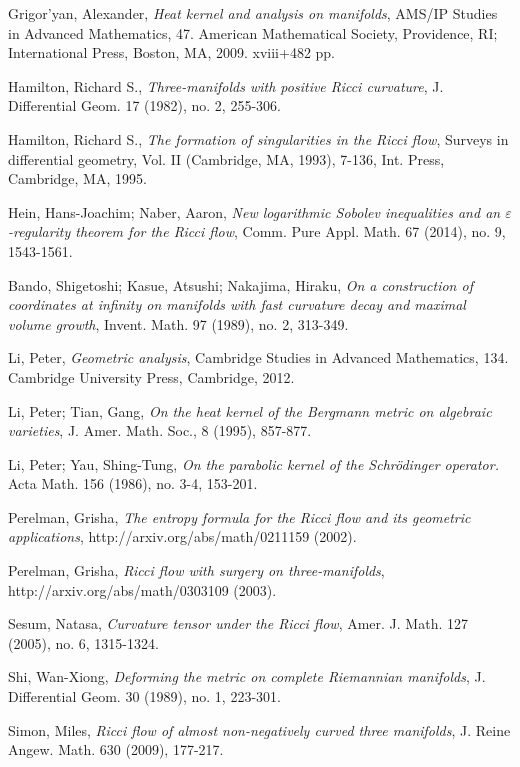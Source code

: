 \documentclass[11pt]{amsart}
\numberwithin{equation}{section}
\numberwithin{equation}{section}
\begin{document}
\begin{thebibliography}{00000}
 Grigor'yan, Alexander, {\it Heat kernel and analysis on manifolds}, AMS/IP Studies in Advanced Mathematics, 47. American Mathematical Society, Providence, RI; International Press, Boston, MA, 2009. xviii+482 pp.

Hamilton, Richard S., {\it Three-manifolds with positive Ricci curvature},
 J. Differential Geom. 17 (1982), no. 2, 255-306.

 Hamilton, Richard S., {\it The formation of singularities in the Ricci flow}, Surveys in differential geometry, Vol. II (Cambridge, MA, 1993), 7-136, Int. Press, Cambridge, MA, 1995.

 Hein, Hans-Joachim; Naber, Aaron, {\it New logarithmic Sobolev inequalities and an $\varepsilon$-regularity theorem for the Ricci flow}, Comm. Pure Appl. Math. 67 (2014), no. 9, 1543-1561.

 Bando, Shigetoshi; Kasue, Atsushi; Nakajima, Hiraku, {\it On a construction of coordinates at infinity on manifolds with fast curvature decay and maximal volume growth},
Invent. Math. 97 (1989), no. 2, 313-349. 

 Li, Peter, {\it Geometric analysis}, Cambridge Studies in Advanced Mathematics, 134. Cambridge University Press, Cambridge, 2012. 

 Li, Peter; Tian, Gang, {\it On the heat kernel of the Bergmann metric on algebraic varieties}, J. Amer. Math. Soc., 8 (1995), 857-877.

 Li, Peter; Yau, Shing-Tung, {\it On the parabolic kernel of the Schr\"odinger operator.}  Acta Math. 156 (1986), no. 3-4, 153-201.

 Perelman, Grisha, {\it The entropy formula for the Ricci flow and its
geometric applications}, http://arxiv.org/abs/math/0211159 (2002).

 Perelman, Grisha, {\it Ricci flow with surgery on three-manifolds}, http://arxiv.org/abs/math/0303109 (2003).

Sesum, Natasa, {\it Curvature tensor under the Ricci flow}, Amer. J. Math. 127 (2005), no. 6, 1315-1324.

 Shi, Wan-Xiong, {\it Deforming the metric on complete Riemannian manifolds}, J. Differential Geom. 30 (1989), no. 1, 223-301. 

 Simon, Miles, {\it  Ricci flow of almost non-negatively curved three manifolds}, J. Reine Angew. Math. 630 (2009), 177-217.


\end{thebibliography}
\end{document}
